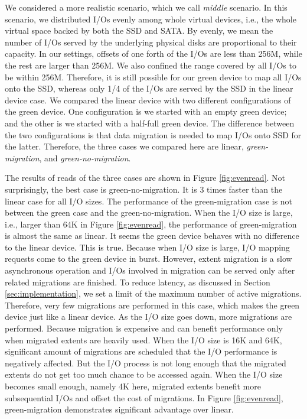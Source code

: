 We considered a more realistic scenario, which we call \textit{middle}
scenario. In this scenario, we distributed I/Os evenly among whole
virtual devices, i.e., the whole virtual space backed by both the SSD
and SATA.  By evenly, we mean the number of I/Os served by the
underlying physical disks are proportional to their capacity.  In our
settings, offsets of one forth of the I/Os are less than 256M, while
the rest are larger than 256M.  We also confined the range covered by
all I/Os to be within 256M.  Therefore, it is still possible for our
green device to map all I/Os onto the SSD, whereas only 1/4 of the
I/Os are served by the SSD in the linear device case.  We compared the
linear device with two different configurations of the green device.
One configuration is we started with an empty green device; and the
other is we started with a half-full green device. The difference
between the two configurations is that data migration is needed to map
I/Os onto SSD for the latter. Therefore, the three cases we compared
here are linear, \textit{green-migration}, and
\textit{green-no-migration}.

The results of reads of the three cases are shown in Figure
\ref{fig:evenread}. Not surprisingly, the best case is
green-no-migration. It is 3 times faster than the linear case for all
I/O sizes. The performance of the green-migration case is not between
the green case and the green-no-migration. When the I/O size is large,
i.e., larger than 64K in Figure \ref{fig:evenread}, the performance of
green-migration is almost the same as linear. It seems the green
device behaves with no difference to the linear device. This is true.
Because when I/O size is large, I/O mapping requests come to the green
device in burst. However, extent migration is a slow asynchronous
operation and I/Os involved in migration can be served only after
related migrations are finished. To reduce latency, as discussed in
Section \ref{sec:implementation}, we set a limit of the maximum number
of active migrations. Therefore, very few migrations are performed in
this case, which makes the green device just like a linear device.  As
the I/O size goes down, more migrations are performed. Because
migration is expensive and can benefit performance only when migrated
extents are heavily used. When the I/O size is 16K and 64K,
significant amount of migrations are scheduled that the I/O
performance is negatively affected. But the I/O process is not long
enough that the migrated extents do not get too much chance to be
accessed again. When the I/O size becomes small enough, namely 4K
here, migrated extents benefit more subsequential I/Os and offset the
cost of migrations. In Figure \ref{fig:evenread}, green-migration
demonstrates significant advantage over linear.

